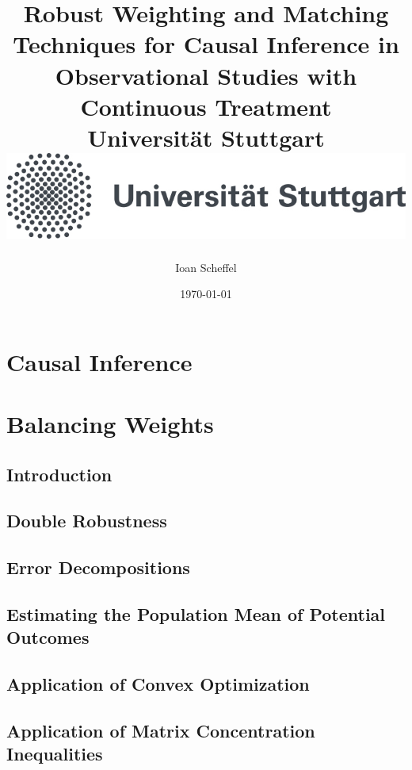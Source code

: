 \documentclass[12pt]{scrreport}
\title{
  {
    Robust Weighting and Matching Techniques for Causal Inference in Observational Studies with Continuous Treatment
  }
  \\
  {\large Universität Stuttgart}
  \\
  {\includegraphics{unistuttgart_logo_deutsch.jpg}}
}
\author{Ioan Scheffel}
\date{\today}
\theoremstyle{remark}
\theoremstyle{plain}
\begin{document}
\listoftodos

\maketitle

\tableofcontents 

%

\chapter{Causal Inference}


\chapter{Balancing Weights}
  \section{Introduction}
  
  \section{Double Robustness}
  
  \section{Error Decompositions}
  
  \section{Estimating the Population Mean of Potential Outcomes}
  
  \section{Application of Convex Optimization}
  
  \section{Application of Matrix Concentration Inequalities}
  
\end{document}
